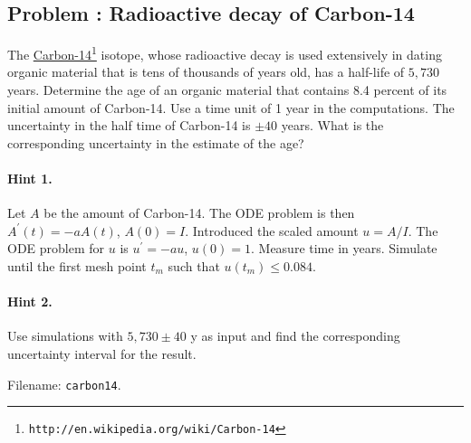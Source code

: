 \documentclass[graybox,sectrefs,envcountresetchap,open=right,final]{svmonodo}
\newenvironment{doconceexercise}{}{}
\newcounter{doconceexercisecounter}
\begin{document}
\begin{doconceexercise}

\subsection*{Problem \thedoconceexercisecounter: Radioactive decay of Carbon-14}

\label{decay:app:exer:radio:C14}

The \href{{http://en.wikipedia.org/wiki/Carbon-14}}{Carbon-14}\footnote{\texttt{http://en.wikipedia.org/wiki/Carbon-14}} isotope,
whose radioactive decay is used extensively in dating organic material
that is tens of thousands of years old, has a half-life of $5,730$
years.  Determine the age of an organic material that contains 8.4 percent
of its initial amount of Carbon-14.  Use a time unit of 1 year in the
computations.  The uncertainty in the half time of Carbon-14 is $\pm
40$ years.  What is the corresponding uncertainty in the estimate of
the age?


\paragraph{Hint 1.}
Let $A$ be the amount of Carbon-14. The ODE problem is then
$A^{\prime}(t)=-aA(t)$, $A(0)=I$. Introduced the scaled amount
$u=A/I$. The ODE problem for $u$ is $u^{\prime}=-au$, $u(0)=1$.
Measure time in years.
Simulate until the first mesh point $t_m$ such that $u(t_m)\leq 0.084$.



\paragraph{Hint 2.}
Use simulations with $5,730\pm 40$ y as input
and find the corresponding uncertainty interval for the result.



\noindent Filename: \texttt{carbon14}.

\end{doconceexercise}
\end{document}
